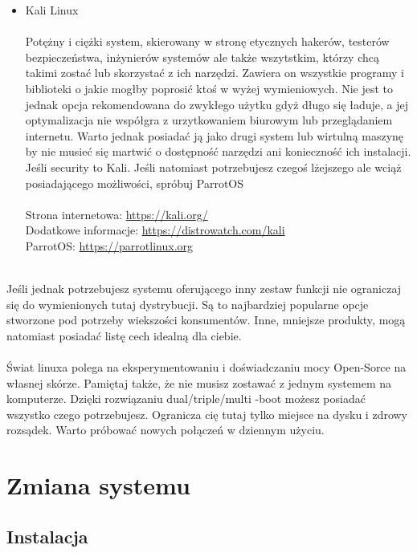 \documentclass[10pt,a4paper]{report}
\begin{document}
\begin{itemize}
\item {\Huge Kali Linux \\\\}Potężny i ciężki system, skierowany w stronę etycznych hakerów, testerów bezpieczeństwa, inżynierów systemów ale także wszytstkim, którzy chcą takimi zostać lub skorzystać z ich narzędzi. Zawiera on wszystkie programy i biblioteki o jakie mogłby poprosić ktoś w wyżej wymieniowych. Nie jest to jednak opcja rekomendowana do zwykłego użytku gdyż długo się ładuje, a jej optymalizacja nie współgra z urzytkowaniem biurowym lub przeglądaniem internetu. Warto jednak posiadać ją jako drugi system lub wirtulną maszynę by nie musieć się martwić o dostępność narzędzi ani konieczność ich instalacji. Jeśli security to Kali. Jeśli natomiast potrzebujesz czegoś lżejszego ale wciąż posiadającego możliwości, spróbuj ParrotOS\\\\Strona internetowa: \url{https://kali.org/}\\ Dodatkowe informacje: \href{https://distrowatch.com/table.php?distribution=kali}{https://distrowatch.com/kali}\\ParrotOS: \url{https://parrotlinux.org}\\\\
\end{itemize}

Jeśli jednak potrzebujesz systemu oferującego inny zestaw funkcji nie ograniczaj się do wymienionych tutaj dystrybucji. Są to najbardziej popularne opcje stworzone pod potrzeby wiekszości konsumentów. Inne, mniejsze produkty, mogą natomiast posiadać listę cech idealną dla ciebie. \\\\Świat linuxa polega na eksperymentowaniu i doświadczaniu mocy Open-Sorce na własnej skórze. Pamiętaj także, że nie musisz zostawać z jednym systemem na komputerze. Dzięki rozwiązaniu dual/triple/multi -boot możesz posiadać wszystko czego potrzebujesz. Ogranicza cię tutaj tylko miejsce na dysku i zdrowy rozsądek. Warto próbować nowych połączeń w dziennym użyciu. 
	
\chapter{Zmiana systemu}

	\section{Instalacja}
	
\end{document}
